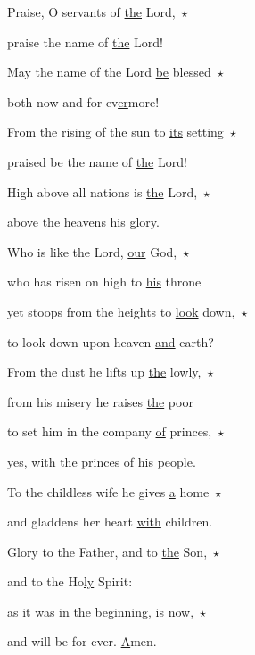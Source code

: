 \noindent Praise, O servants of \uline{the} Lord,~$\star$~\nopagebreak

praise the name of \uline{the} Lord!

\noindent May the name of the Lord \uline{be} blessed~$\star$~\nopagebreak

both now and for ev\uline{er}more!

\noindent From the rising of the sun to \uline{its} setting~$\star$~\nopagebreak

praised be the name of \uline{the} Lord!

\noindent High above all nations is \uline{the} Lord,~$\star$~\nopagebreak

above the heavens \uline{his} glory.

\noindent Who is like the Lord, \uline{our} God,~$\star$~\nopagebreak

who has risen on high to \uline{his} throne

\noindent yet stoops from the heights to \uline{look} down,~$\star$~\nopagebreak

to look down upon heaven \uline{and} earth?

\noindent From the dust he lifts up \uline{the} lowly,~$\star$~\nopagebreak

from his misery he raises \uline{the} poor

\noindent to set him in the company \uline{of} princes,~$\star$~\nopagebreak

yes, with the princes of \uline{his} people.

\noindent To the childless wife he gives \uline{a} home~$\star$~\nopagebreak

and gladdens her heart \uline{with} children.

\noindent Glory to the Father, and to \uline{the} Son,~$\star$~\nopagebreak

and to the Ho\uline{ly} Spirit:

\noindent as it was in the beginning, \uline{is} now,~$\star$~\nopagebreak

and will be for ever. \uline{A}men.

